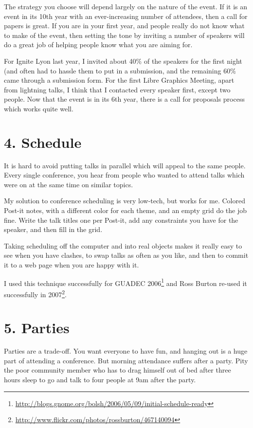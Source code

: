 The strategy you choose will depend largely on the nature of the event.
If it is an event in its 10th year with an ever-increasing number of
attendees, then a call for papers is great. If you are in your first
year, and people really do not know what to make of the event, then
setting the tone by inviting a number of speakers will do a great job of
helping people know what you are aiming for.

For Ignite Lyon last year, I invited about 40\% of the speakers for the
first night (and often had to hassle them to put in a submission, and
the remaining 60\% came through a submission form. For the first Libre
Graphics Meeting, apart from lightning talks, I think that I contacted
every speaker first, except two people. Now that the event is in its 6th year,
there is a call for proposals process which works quite well.

\section*{4. Schedule}

It is hard to avoid putting talks in parallel which will appeal to the same people. Every single conference, you hear from people who wanted to
attend talks which were on at the same time on similar topics.

My solution to conference scheduling is very low-tech, but works for me.
Colored Post-it notes, with a different color for each theme, and an empty
grid do the job fine. Write the talk titles one per Post-it, add any constraints you have for the speaker, and then fill in the grid.

Taking scheduling off the computer and into real objects makes it really
easy to see when you have clashes, to swap talks as often as you like,
and then to commit it to a web page when you are happy with it.

I used this technique successfully for GUADEC
2006\footnote{\url{
http://blogs.gnome.org/bolsh/2006/05/09/initial-schedule-ready}} and Ross
Burton re-used it successfully in
2007\footnote{\url{http://www.flickr.com/photos/rossburton/467140094}}.

\section*{5. Parties}

Parties are a trade-off. You want everyone to have fun, and hanging out
is a huge part of attending a conference. But morning attendance suffers
after a party. Pity the poor community member who has to drag himself
out of bed after three hours sleep to go and talk to four people at 9am after
the party.

